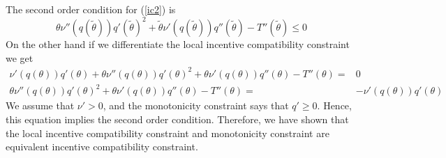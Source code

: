 The second order condition for (\ref{ic2}) is 
\[ \theta \nu''(q(\tilde{\theta}))q'(\tilde{\theta})^2 +
\tilde{\theta} \nu'(q(\tilde{\theta})) q''(\tilde{\theta}) -
T''(\tilde{\theta}) \leq 0 \]   
On the other hand if we differentiate the local incentive
compatibility constraint we get 
\begin{align*}
  \nu'(q(\theta))q'(\theta) + \theta \nu''(q(\theta)) q'(\theta)^2 + \theta
  \nu'(q(\theta)) q''(\theta) - T''(\theta) = & 0 \\
  \theta \nu''(q(\theta)) q'(\theta)^2 + \theta
  \nu'(q(\theta)) q''(\theta) - T''(\theta) = & -\nu'(q(\theta))q'(\theta)  
\end{align*}
We assume that $\nu'>0$, and the monotonicity constraint says that
$q'\geq 0$. Hence, this equation implies the second order
condition. Therefore, we have shown that the local incentive
compatibility constraint and monotonicity constraint are equivalent
incentive compatibility constraint.

